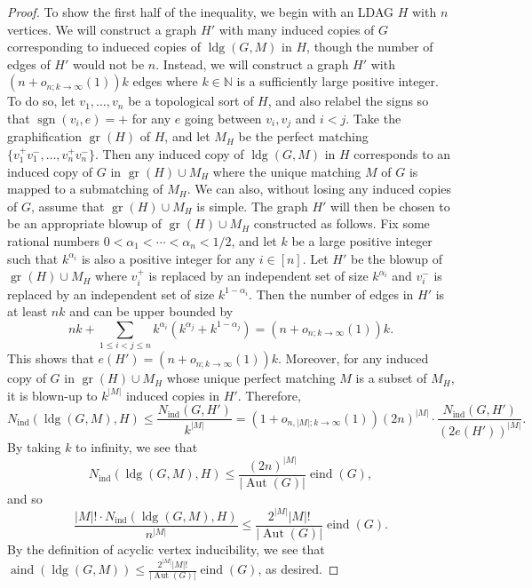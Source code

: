 \documentclass[10pt,a4paper]{amsart}
\DeclareMathOperator{\Aut}{Aut}
\DeclareMathOperator{\aind}{aind}
\DeclareMathOperator{\eind}{eind}
\DeclareMathOperator{\gr}{gr}
\DeclareMathOperator{\ind}{ind}
\DeclareMathOperator{\ldg}{ldg}
\DeclareMathOperator{\sgn}{sgn}
\newcommand{\NN}{\mathbb{N}}
\newcommand{\abs}[1]{\left\lvert#1\right\rvert}
\begin{document}
\begin{proof}
    To show the first half of the inequality, we begin with an LDAG $H$ with $n$ vertices.
    We will construct a graph $H'$ with many induced copies of $G$ corresponding to indueced copies of $\ldg(G,M)$ in $H$, though the number of edges of $H'$ would not be $n$.
    Instead, we will construct a graph $H'$ with $(n+o_{n;k\to\infty}(1))k$ edges where $k\in\NN$ is a sufficiently large positive integer.
    To do so, let $v_1,\ldots, v_n$ be a topological sort of $H$, and also relabel the signs so that $\sgn(v_i,e)=+$ for any $e$ going between $v_i,v_j$ and $i<j$.
    Take the graphification $\gr(H)$ of $H$, and let $M_H$ be the perfect matching $\{v_1^+v_1^-,\ldots, v_n^+v_n^-\}$.
    Then any induced copy of $\ldg(G,M)$ in $H$ corresponds to an induced copy of $G$ in $\gr(H)\cup M_H$ where the unique matching $M$ of $G$ is mapped to a submatching of $M_H$.
    We can also, without losing any induced copies of $G$, assume that $\gr(H)\cup M_H$ is simple.
    The graph $H'$ will then be chosen to be an appropriate blowup of $\gr(H)\cup M_H$ constructed as follows.
    Fix some rational numbers $0<\alpha_1<\cdots <\alpha_n<1/2$, and let $k$ be a large positive integer such that $k^{\alpha_i}$ is also a positive integer for any $i\in[n]$.
    Let $H'$ be the blowup of $\gr(H)\cup M_H$ where $v_i^+$ is replaced by an independent set of size $k^{\alpha_i}$ and $v_i^-$ is replaced by an independent set of size $k^{1-\alpha_i}$.
    Then the number of edges in $H'$ is at least $nk$ and can be upper bounded by
    \[nk+\sum_{1\leq i<j\leq n}k^{\alpha_i}\left(k^{\alpha_j}+k^{1-\alpha_j}\right) = (n+o_{n;k\to\infty}(1))k.\]
    This shows that $e(H') = (n+o_{n;k\to\infty}(1))k$.
    Moreover, for any induced copy of $G$ in $\gr(H)\cup M_H$ whose unique perfect matching $M$ is a subset of $M_H$, it is blown-up to $k^{\abs{M}}$ induced copies in $H'$.
    Therefore,
    \[ N_{\ind}(\ldg(G,M),H)\leq  \frac{N_{\ind}(G,H')}{k^{\abs{M}}}
        =(1+o_{n,\abs{M};k\to\infty}(1))(2n)^{\abs{M}}\cdot \frac{N_{\ind}(G,H')}{(2e(H'))^{\abs{M}}}.\]
    By taking $k$ to infinity, we see that
    \[N_{\ind}(\ldg(G,M),H)\leq \frac{(2n)^{\abs{M}}}{\abs{\Aut(G)}}\eind(G),\]
    and so
     \[\frac{\abs{M}!\cdot N_{\ind}(\ldg(G,M),H)}{n^{\abs{M}}}\leq \frac{2^{\abs{M}}\abs{M}!}{\abs{\Aut(G)}}\eind(G).\]
    By the definition of acyclic vertex inducibility, we see that $\aind(\ldg(G,M))\leq \frac{2^{\abs{M}}\abs{M}!}{\abs{\Aut(G)}}\eind(G)$, as desired.
\end{proof}
\end{document}
